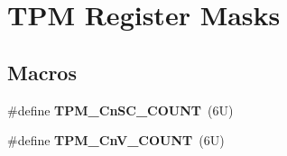\hypertarget{group___t_p_m___register___masks}{}\section{T\+PM Register Masks}
\label{group___t_p_m___register___masks}
\subsection*{Macros}
\begin{DoxyCompactItemize}
\item 
\mbox{\label{group___t_p_m___register___masks_ga5e0f281dcf1bee0c4500c5f99c14f909}} 
\#define {\bfseries T\+P\+M\+\_\+\+Cn\+S\+C\+\_\+\+C\+O\+U\+NT}~(6\+U)
\item 
\mbox{\label{group___t_p_m___register___masks_ga26a5513883384b455a94bf705e78fe15}} 
\#define {\bfseries T\+P\+M\+\_\+\+Cn\+V\+\_\+\+C\+O\+U\+NT}~(6\+U)
\end{DoxyCompactItemize}
